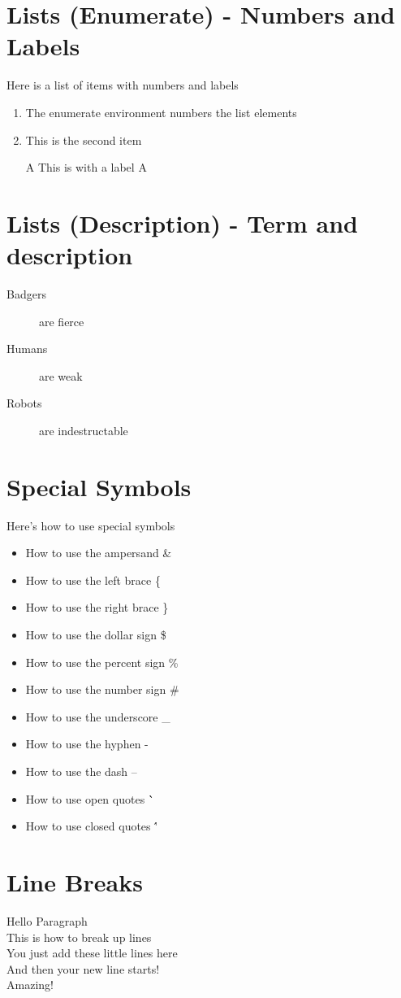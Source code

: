 \documentclass[11pt]{report}  %
\begin{document}
\section*{Lists (Enumerate) - Numbers and Labels}
Here is a list of items with numbers and labels
\begin{enumerate}  %
\item The enumerate environment numbers the list elements
\item This is the second item
\item[A] This is with a label A
\end{enumerate}

\section*{Lists (Description) - Term and description}
\begin{description}
\item[Badgers] are fierce
\item[Humans] are weak
\item[Robots] are indestructable
\end{description}

\section*{Special Symbols}
Here's how to use special symbols
\begin{itemize}
\item How to use the ampersand \&
\item How to use the left brace \{
\item How to use the right brace \}
\item How to use the dollar sign \$
\item How to use the percent sign \%
\item How to use the number sign \#
\item How to use the underscore \_
\item How to use the hyphen \--
\item How to use the dash \---
\item How to use open quotes \``
\item How to use closed quotes \''
\end{itemize}

\section*{Line Breaks}
\begin{paragraph} Hello Paragraph  \\
This is how to break up lines \\
You just add these little lines here \\
And then your new line starts! \\
Amazing!
\end{paragraph}
\end{document}
